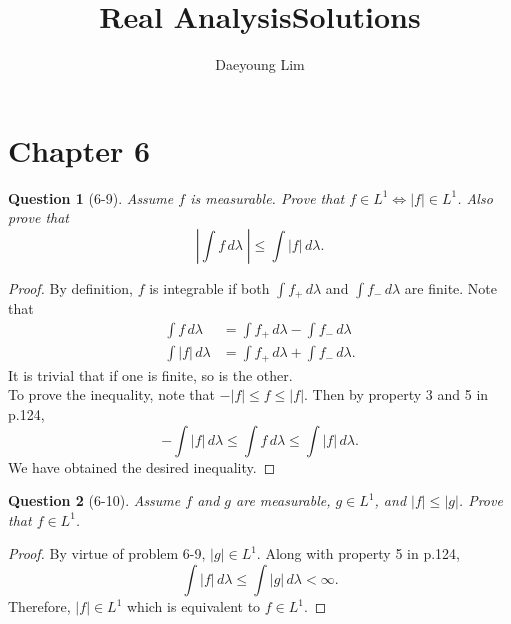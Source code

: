 \documentclass[11pt]{article}
\title{\vspace{-50pt}
\huge Real Analysis\hfill Solutions}
\author{Daeyoung Lim}
\date{}
\theoremstyle{quest}
\newtheorem*{question}{Question}
\begin{document}
\maketitle
{}
\section*{Chapter 6}
\begin{question}[6-9]
  Assume $f$ is measurable. Prove that $f \in L^{1} \iff |f| \in L^{1}$. Also prove that
  $$
    | \int f \,d\lambda \;| \leq \int |f|\,d\lambda.
  $$
\end{question}
\begin{proof}
  By definition, $f$ is integrable if both $\int f_{+} \, d\lambda$ and $\int f_{-}\,d\lambda$ are finite. Note that
    \begin{align*}
      \int f \, d\lambda &= \int f_{+}\, d\lambda - \int f_{-}\,d\lambda\\
      \int |f| \, d\lambda &= \int f_{+}\, d\lambda + \int f_{-}\,d\lambda .
    \end{align*}
    It is trivial that if one is finite, so is the other.\\
    To prove the inequality, note that $-|f| \leq f \leq |f|$. Then by property 3 and 5 in p.124,
    $$
      -\int |f|\,d\lambda \leq \int f\,d\lambda \leq \int |f|\, d\lambda.
    $$
    We have obtained the desired inequality.
\end{proof}

\begin{question}[6-10]
  Assume $f$ and $g$ are measurable, $g \in L^{1}$, and $|f| \leq |g|$. Prove that $f \in L^{1}$.
\end{question}
\begin{proof}
  By virtue of problem 6-9, $|g| \in L^{1}$. Along with property 5 in p.124,
  $$
    \int |f|\,d\lambda \leq \int |g|\, d\lambda < \infty.
  $$
  Therefore, $|f| \in L^{1}$ which is equivalent to $f \in L^{1}$.
\end{proof}
\end{document}
